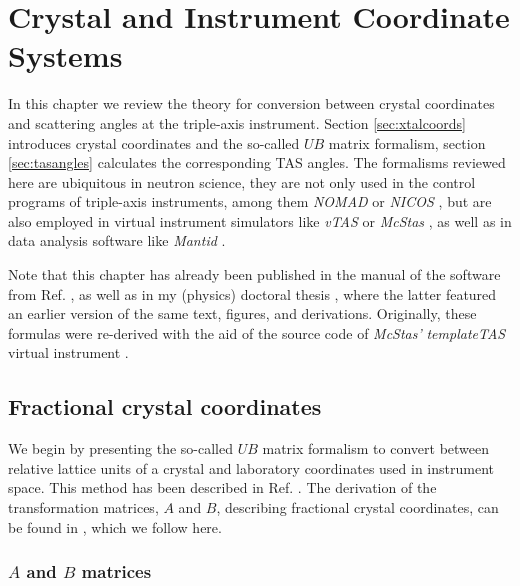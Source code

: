 %
%

\chapter{Crystal and Instrument Coordinate Systems}
\label{ch:xtal}

In this chapter we review the theory for conversion between crystal coordinates and scattering angles 
at the triple-axis instrument. Section \ref{sec:xtalcoords} introduces crystal coordinates and the so-called 
$UB$ matrix formalism, section \ref{sec:tasangles} calculates the corresponding TAS angles. 
The formalisms \cite{Lumsden2005} reviewed here are ubiquitous in neutron science, they are not only used 
in the control programs of triple-axis instruments, among them \textit{NOMAD} \cite{web_NOMAD} 
or \textit{NICOS} \cite{web_NICOS}, but are also employed in virtual instrument simulators like \textit{vTAS} \cite{vTAS2013} or 
\textit{McStas} \cite{McStas2020}, as well as in data analysis software like \textit{Mantid} \cite{Arnold2014}.

Note that this chapter has already been published in the manual of the software from Ref. \cite{Takin2021},
as well as in my (physics) doctoral thesis \cite[pp. 139-143]{PhDWeber},
where the latter featured an earlier version of the same text, figures, and derivations.
Originally, these formulas were re-derived with the aid of the source
code of \textit{McStas'} \textit{templateTAS} virtual instrument \cite{web_mcstas_templateTAS, McStas2020}.


\section{Fractional crystal coordinates \label{sec:xtalcoords}}

We begin by presenting the so-called $UB$ matrix formalism to convert between relative lattice units 
of a crystal and laboratory coordinates used in instrument space. This method has been described in 
Ref. \cite{Lumsden2005}. The derivation of the transformation matrices, $A$ and $B$, describing fractional
crystal coordinates, can be found in \cite{wiki_fractional}, which we follow here.

\subsection{$A$ and $B$ matrices}
